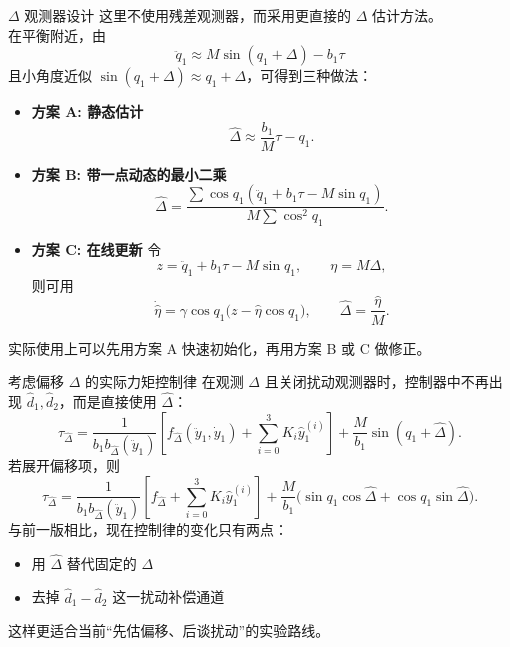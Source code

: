 \begin{frame}{\texorpdfstring{$\Delta$}{Delta} 观测器设计}
    \scriptsize
    这里不使用残差观测器，而采用更直接的 $\Delta$ 估计方法。\\[0.4em]
    在平衡附近，由
    \[
    \ddot q_1 \approx M\sin(q_1+\Delta)-b_1\tau
    \]
    且小角度近似 $\sin(q_1+\Delta)\approx q_1+\Delta$，可得到三种做法：
    \begin{itemize}
        \setlength{\itemsep}{0.35em}
        \item \textbf{方案 A: 静态估计}
        \[
        \hat\Delta \approx \frac{b_1}{M}\tau - q_1.
        \]
        \item \textbf{方案 B: 带一点动态的最小二乘}
        \[
        \hat\Delta =
        \frac{\sum \cos q_1 \left(\ddot q_1+b_1\tau-M\sin q_1\right)}
        {M\sum \cos^2 q_1}.
        \]
        \item \textbf{方案 C: 在线更新}
        令
        \[
        z=\ddot q_1+b_1\tau-M\sin q_1,
        \qquad
        \eta = M\Delta,
        \]
        则可用
        \[
        \dot{\hat \eta}
        =
        \gamma \cos q_1 \bigl(z-\hat\eta\cos q_1\bigr),
        \qquad \hat\Delta=\frac{\hat\eta}{M}.
        \]
    \end{itemize}
    实际使用上可以先用方案 A 快速初始化，再用方案 B 或 C 做修正。
\end{frame}

\begin{frame}{考虑偏移 $\Delta$ 的实际力矩控制律}
    \scriptsize
    在观测 $\Delta$ 且关闭扰动观测器时，控制器中不再出现 $\hat d_1,\hat d_2$，而是直接使用 $\hat\Delta$：
    \[
    \tau_{\hat\Delta}=
    \frac{1}{b_1 b_{\hat\Delta}(\ddot y_1)}
    \left[
    f_{\hat\Delta}(\ddot y_1,\dot y_1)+\sum_{i=0}^{3}K_i \hat y_1^{(i)}
    \right]
    +\frac{M}{b_1}\sin(q_1+\hat\Delta).
    \]
    若展开偏移项，则
    \[
    \tau_{\hat\Delta}=
    \frac{1}{b_1 b_{\hat\Delta}(\ddot y_1)}
    \left[
    f_{\hat\Delta}+\sum_{i=0}^{3}K_i \hat y_1^{(i)}
    \right]
    +\frac{M}{b_1}
    \bigl(\sin q_1\cos\hat\Delta+\cos q_1\sin\hat\Delta\bigr).
    \]
    与前一版相比，现在控制律的变化只有两点：
    \begin{itemize}
        \setlength{\itemsep}{0.3em}
        \item 用 $\hat\Delta$ 替代固定的 $\Delta$
        \item 去掉 $\hat d_1-\hat d_2$ 这一扰动补偿通道
    \end{itemize}
    这样更适合当前“先估偏移、后谈扰动”的实验路线。
\end{frame}

